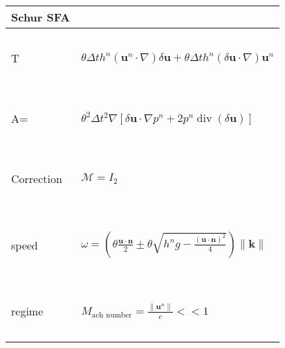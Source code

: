 \documentclass[a4paper, 11pt]{report}
\begin{document}
\hspace*{3.5cm}\begin{minipage}[r]{4cm}
\begin{tiny}
\begin{tabular}{|l|l|}
  \hline
  Schur SFA &  \\
  \hline
  ~ & ~\\
  T &  $\theta\Delta th^n\left(\boldsymbol{u}^n\cdot\nabla\right)\delta \boldsymbol{u}+\theta\Delta th^n\left(\delta \boldsymbol{u} \cdot\nabla\right)\boldsymbol{u}^n$ \\ 
  ~ & ~\\
    \hline
   ~& ~\\ 
  A= & $\theta^2 \Delta t^2 \nabla\left[ \delta \boldsymbol{u}\cdot \nabla p^n + 2p^n \operatorname{div}(\delta \boldsymbol{u}) \right] $\\
  ~ & ~\\
      \hline
     ~ &~ \\
   Correction &  $\mathcal{M}=I_2$ \\ 
   ~ & ~\\
    \hline
     ~ &~ \\
  speed & $\omega =\left(\theta\frac{\boldsymbol{u}\cdot \boldsymbol{n}}{2}\pm\theta\sqrt{h^ng-\frac{(\boldsymbol{u}\cdot \boldsymbol{n})^2}{4}}\right) \parallel \boldsymbol{k} \parallel$ \\ 
   ~ & ~\\
    \hline
    ~& ~\\
  regime & $M_{\text{ach number}}= \frac{\parallel \boldsymbol{u}^n \parallel }{c}<< 1$\\
   ~& ~\\
    \hline
\end{tabular}
\end{tiny}
\end{minipage}
\end{document}

